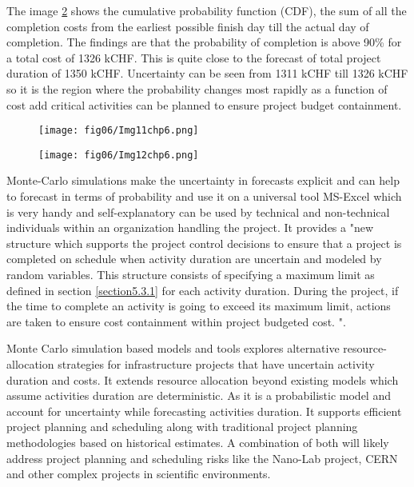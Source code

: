 The image \ref{img12ch6} shows the cumulative probability function (CDF), the sum of all the completion costs from the earliest possible finish day till the actual day of completion. The findings are that the probability of completion is above 90\% for a total cost of 1326 kCHF. This is quite close to the forecast of total project duration of 1350 kCHF. Uncertainty can be seen from 1311 kCHF till 1326 kCHF so it is the region where the probability changes most rapidly as a function of cost add critical activities can be planned to ensure project budget containment.

\begin{figure}
	\centering
	\texttt{[image: fig06/Img11chp6.png]}
	\label{img11ch6}
\end{figure}
\begin{figure}
	\centering
	\texttt{[image: fig06/Img12chp6.png]}
	\label{img12ch6}
\end{figure}
 
 Monte-Carlo simulations make the uncertainty in forecasts explicit and can help to forecast in terms of probability and use it on a universal tool MS-Excel which is very handy and self-explanatory can be used by technical and non-technical individuals within an organization handling the project. It provides a  "new structure which supports the project control decisions to ensure that a project is completed on schedule when activity duration are uncertain and modeled by random variables. This structure consists of specifying a maximum limit as defined in section \ref{section5.3.1} for each activity duration. During the project, if the time to complete an activity is going to exceed its maximum limit, actions are taken to ensure cost containment within project budgeted cost. "\cite{BOWMAN20061191}.
 
Monte Carlo simulation based models and tools explores alternative resource-allocation strategies for infrastructure projects that have uncertain activity duration and costs. It extends resource allocation beyond existing models which assume activities duration are deterministic. As it is a probabilistic model and account for uncertainty while forecasting activities duration. It supports efficient project planning and scheduling along with traditional project planning methodologies based on historical estimates. A combination of both will likely address project planning and scheduling risks like the Nano-Lab project, CERN and other complex projects in scientific environments.
 
 

